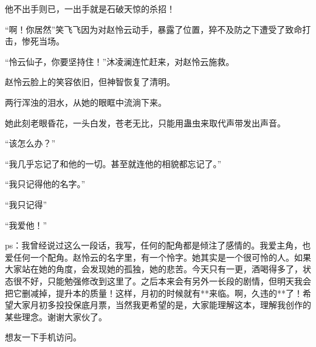 \begin{this_body}
他不出手则已，一出手就是石破天惊的杀招！

“啊！你居然”笑飞飞因为对赵怜云动手，暴露了位置，猝不及防之下遭受了致命打击，惨死当场。

“怜云仙子，你要坚持住！”沐凌澜连忙赶来，对赵怜云施救。

赵怜云脸上的笑容依旧，但神智恢复了清明。

两行浑浊的泪水，从她的眼眶中流淌下来。

她此刻老眼昏花，一头白发，苍老无比，只能用蛊虫来取代声带发出声音。

“该怎么办？”

“我几乎忘记了和他的一切。甚至就连他的相貌都忘记了。”

“我只记得他的名字。”

“我只记得”

“我爱他！”

ps：我曾经说过这么一段话，我写，任何的配角都是倾注了感情的。我爱主角，也爱任何一个配角。赵怜云的名字里，有一个怜字。她其实是一个很可怜的人。如果大家站在她的角度，会发现她的孤独，她的悲苦。今天只有一更，酒喝得多了，状态很不好，只能勉强修改到这里了。之后本来会有另外一长段的剧情，但明天我会把它删减掉，提升本的质量！这样，月初的时候就有**来临。啊，久违的**了！希望大家月初多投投保底月票，当然我更希望的是，大家能理解这本，理解我创作的某些理念。谢谢大家伙了。

想友一下手机访问。

\end{this_body}

